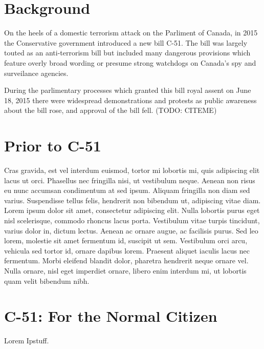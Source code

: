 \documentclass[a4paper, 11pt]{article} %
\begin{document}

\section*{Background}
On the heels of a domestic terrorism attack on the Parliment of Canada, in 2015 the Conservative government introduced a new bill C-51. The bill was largely touted as an anti-terrorism bill but included many dangerous provisions which feature overly broad wording or presume strong watchdogs on Canada's spy and surveilance agencies.

During the parlimentary processes which granted this bill royal assent on June 18, 2015 there were widespread demonstrations and protests as public awareness about the bill rose, and approval of the bill fell. (TODO: CITEME)


\section*{Prior to C-51}

Cras gravida, est vel interdum euismod, tortor mi lobortis mi, quis adipiscing elit lacus ut orci. Phasellus nec fringilla nisi, ut vestibulum neque. Aenean non risus eu nunc accumsan condimentum at sed ipsum.
Aliquam fringilla non diam sed varius. Suspendisse tellus felis, hendrerit non bibendum ut, adipiscing vitae diam. Lorem ipsum dolor sit amet, consectetur adipiscing elit. Nulla lobortis purus eget nisl scelerisque, commodo rhoncus lacus porta. Vestibulum vitae turpis tincidunt, varius dolor in, dictum lectus. Aenean ac ornare augue, ac facilisis purus. Sed leo lorem, molestie sit amet fermentum id, suscipit ut sem. Vestibulum orci arcu, vehicula sed tortor id, ornare dapibus lorem. Praesent aliquet iaculis lacus nec fermentum. Morbi eleifend blandit dolor, pharetra hendrerit neque ornare vel. Nulla ornare, nisl eget imperdiet ornare, libero enim interdum mi, ut lobortis quam velit bibendum nibh.


\section*{C-51: For the Normal Citizen}
Lorem Ipstuff.
\end{document}
